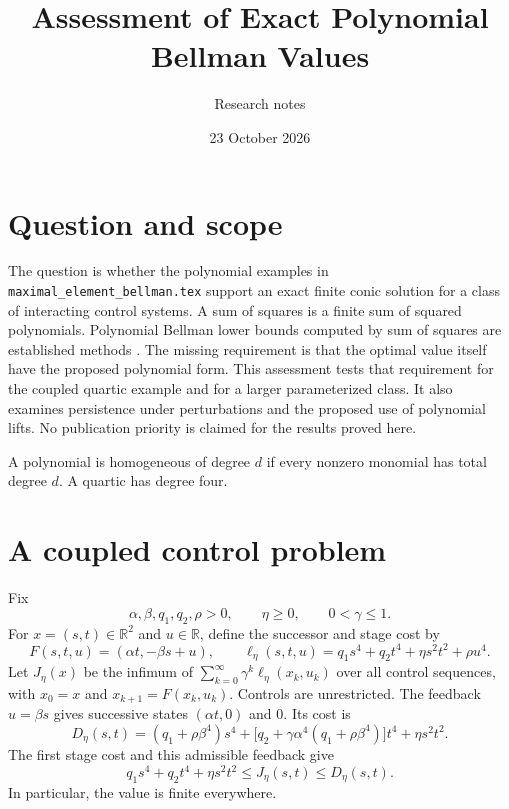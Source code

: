 \documentclass[10pt]{article}
\title{Assessment of Exact Polynomial Bellman Values}
\author{Research notes}
\date{23 October 2026}
\newcommand{\R}{\mathbb R}
\begin{document}
\maketitle

\section{Question and scope}

The question is whether the polynomial examples in \texttt{maximal\_element\_bellman.tex} support an exact finite conic solution for a class of interacting control systems. A sum of squares is a finite sum of squared polynomials. Polynomial Bellman lower bounds computed by sum of squares are established methods \cite[Section III]{summers}. The missing requirement is that the optimal value itself have the proposed polynomial form. This assessment tests that requirement for the coupled quartic example and for a larger parameterized class. It also examines persistence under perturbations and the proposed use of polynomial lifts. No publication priority is claimed for the results proved here.

A polynomial is homogeneous of degree $d$ if every nonzero monomial has total degree $d$. A quartic has degree four.

\section{A coupled control problem}

Fix
\begin{equation}
 \alpha,\beta,q_1,q_2,\rho>0,\qquad \eta\geq0,\qquad 0<\gamma\leq1.
 \label{eq:data}
\end{equation}
For $x=(s,t)\in\R^2$ and $u\in\R$, define the successor and stage cost by
\begin{equation}
 F(s,t,u)=(\alpha t,-\beta s+u),\qquad
 \ell_\eta(s,t,u)=q_1s^4+q_2t^4+\eta s^2t^2+\rho u^4.
 \label{eq:problem}
\end{equation}
Let $J_\eta(x)$ be the infimum of $\sum_{k=0}^\infty\gamma^k\ell_\eta(x_k,u_k)$ over all control sequences, with $x_0=x$ and $x_{k+1}=F(x_k,u_k)$. Controls are unrestricted. The feedback $u=\beta s$ gives successive states $(\alpha t,0)$ and $0$. Its cost is
\begin{equation}
 D_\eta(s,t)=(q_1+\rho\beta^4)s^4+
 \bigl[q_2+\gamma\alpha^4(q_1+\rho\beta^4)\bigr]t^4+\eta s^2t^2.
 \label{eq:deadbeat}
\end{equation}
The first stage cost and this admissible feedback give
\begin{equation}
 q_1s^4+q_2t^4+\eta s^2t^2\leq J_\eta(s,t)\leq D_\eta(s,t).
 \label{eq:bounds}
\end{equation}
In particular, the value is finite everywhere.
\end{document}
